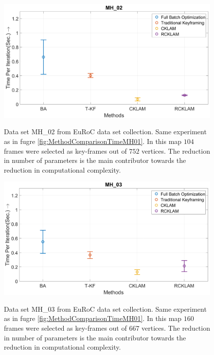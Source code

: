 \begin{figure}
	\centering
		\includegraphics[width=1.00\textwidth]{images/MethodComparisonTimeMH02.png}
	\label{fig:MethodComparisonTimeMH02}
  \caption{Data set MH\_02 from EuRoC \cite{Burri25012016} data set collection. Same experiment as in fugre \ref{fig:MethodComparisonTimeMH01}. In this map $104$ frames were selected as key-frames out of $752$ vertices. The reduction in number of parameters is the main contributor towards the reduction in computational complexity.}
\end{figure}

\begin{figure}
	\centering
		\includegraphics[width=1.00\textwidth]{images/MethodComparisonTimeMH03.png}
	\label{fig:MethodComparisonTimeMH03}
  \caption{Data set MH\_03 from EuRoC \cite{Burri25012016} data set collection. Same experiment as in fugre \ref{fig:MethodComparisonTimeMH01}. In this map $160$ frames were selected as key-frames out of $667$ vertices. The reduction in number of parameters is the main contributor towards the reduction in computational complexity.}
\end{figure}

